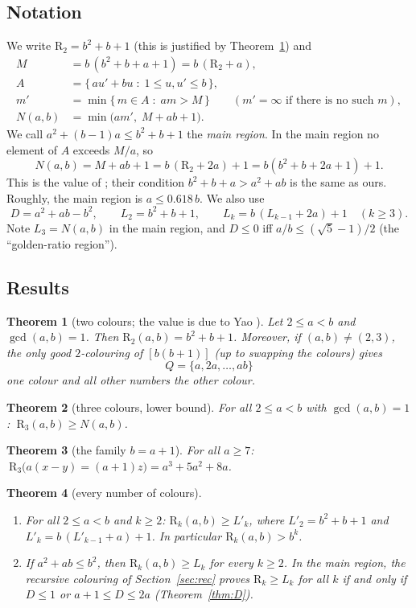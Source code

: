 \documentclass[11pt,a4paper]{article}
\newtheorem{theorem}{Theorem}[section]
\theoremstyle{definition}
\theoremstyle{remark}
\newcommand{\R}{\mathrm{R}}
\begin{document}
\subsection{Notation}
We write $\R_2=b^2+b+1$ (this is justified by Theorem~\ref{thm:R2}) and
\begin{align*}
  M &= b\,(b^2+b+a+1)=b\,(\R_2+a), \\
  A &= \{\,au'+bu \;:\; 1\le u,u'\le b\,\}, \\
  m' &= \min\{\,m\in A \;:\; am>M\,\}\qquad(\text{$m'=\infty$ if there is no such $m$}),\\
  N(a,b) &= \min\bigl(am',\; M+ab+1\bigr).
\end{align*}
We call $a^2+(b-1)a\le b^2+b+1$ the \emph{main region}. In the main region no element of $A$ exceeds $M/a$, so
\[
  N(a,b)=M+ab+1=b\,(\R_2+2a)+1=b(b^2+b+2a+1)+1 .
\]
This is the value of \cite{AZB25}; their condition $b^2+b+a>a^2+ab$ is the same as ours. Roughly, the main region is $a\le0.618\,b$. We also use
\[
  D=a^2+ab-b^2,\qquad L_2=b^2+b+1,\qquad L_k=b\,(L_{k-1}+2a)+1\quad(k\ge3).
\]
Note $L_3=N(a,b)$ in the main region, and $D\le0$ iff $a/b\le(\sqrt5-1)/2$ (the ``golden-ratio region'').

\subsection{Results}
\begin{theorem}[two colours; the value is due to Yao \cite{Yao14}]\label{thm:R2}
Let $2\le a<b$ and $\gcd(a,b)=1$. Then $\R_2(a,b)=b^2+b+1$. Moreover, if $(a,b)\ne(2,3)$, the only good $2$-colouring of $[b(b+1)]$ (up to swapping the colours) gives
\[
  Q=\{a,2a,\dots,ab\}
\]
one colour and all other numbers the other colour.
\end{theorem}

\begin{theorem}[three colours, lower bound]\label{thm:lower}
For all $2\le a<b$ with $\gcd(a,b)=1$: $\ \R_3(a,b)\ge N(a,b)$.
\end{theorem}

\begin{theorem}[the family $b=a+1$]\label{thm:j1}
For all $a\ge7$: $\ \R_3\bigl(a(x-y)=(a+1)z\bigr)=a^3+5a^2+8a$.
\end{theorem}

\begin{theorem}[every number of colours]\label{thm:R}
\begin{enumerate}[label=(\alph*)]
\item For all $2\le a<b$ and $k\ge2$: $\R_k(a,b)\ge L'_k$, where $L'_2=b^2+b+1$ and $L'_k=b\,(L'_{k-1}+a)+1$. In particular $\R_k(a,b)>b^k$.
\item If $a^2+ab\le b^2$, then $\R_k(a,b)\ge L_k$ for every $k\ge2$. In the main region, the recursive colouring of Section~\ref{sec:rec} proves $\R_k\ge L_k$ for all $k$ if and only if $D\le1$ or $a+1\le D\le2a$ (Theorem~\ref{thm:D}).
\end{enumerate}
\end{theorem}
\end{document}
